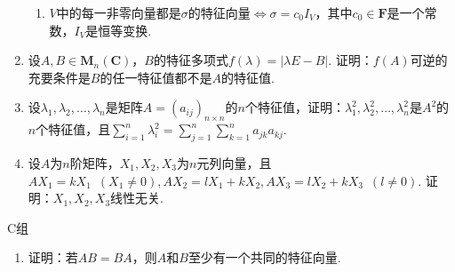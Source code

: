 \begin{enumerate}
\begin{enumerate}
              \item $V$中的每一非零向量都是$\sigma$的特征向量$\iff\sigma=c_0I_V$，其中$c_0\in\mathbf{F}$是一个常数，$I_V$是恒等变换.
          \end{enumerate}

    \item 设$A,B\in \mathbf{M}_n(\mathbf{C})$，$B$的特征多项式$f(\lambda)=|\lambda E-B|$. 证明：$f(A)$可逆的充要条件是$B$的任一特征值都不是$A$的特征值.

    \item 设$\lambda_1,\lambda_2,\ldots,\lambda_n$是矩阵$A=(a_{ij})_{n\times n}$的$n$个特征值，证明：$\lambda_1^2,\lambda_2^2,\ldots,\lambda_n^2$是$A^2$的$n$个特征值，且$\displaystyle\sum_{i=1}^{n}\lambda_i^2=\displaystyle\sum_{j=1}^{n}\displaystyle\sum_{k=1}^{n}a_{jk}a_{kj}$.

    \item 设$A$为$n$阶矩阵，$X_1,X_2,X_3$为$n$元列向量，且$AX_1=kX_1\enspace(X_1\neq 0),AX_2=lX_1+kX_2,AX_3=lX_2+kX_3\enspace(l\neq 0)$. 证明：$X_1,X_2,X_3$线性无关.
\end{enumerate}

\centerline{\heiti C组}
\begin{enumerate}
    \item 证明：若$AB=BA$，则$A$和$B$至少有一个共同的特征向量.
\end{enumerate}
